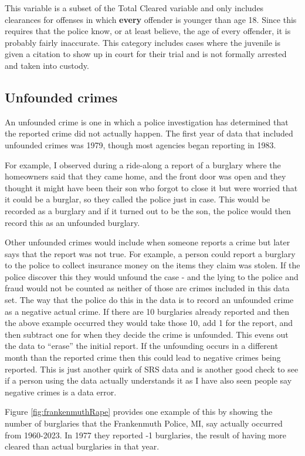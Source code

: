 \documentclass[
]{krantz}
\begin{document}
This variable is a subset of the Total Cleared variable and
only includes clearances for offenses in which
\textbf{every} offender is younger than age 18. Since this
requires that the police know, or at least believe, the age
of every offender, it is probably fairly inaccurate. This
category includes cases where the juvenile is given a
citation to show up in court for their trial and is not
formally arrested and taken into custody.

\subsection{Unfounded crimes}\label{unfounded}

An unfounded crime is one in which a police investigation
has determined that the reported crime did not actually
happen. The first year of data that included unfounded
crimes was 1979, though most agencies began reporting in
1983.

For example, I observed during a ride-along a report of a
burglary where the homeowners said that they came home, and
the front door was open and they thought it might have been
their son who forgot to close it but were worried that it
could be a burglar, so they called the police just in case.
This would be recorded as a burglary and if it turned out to
be the son, the police would then record this as an
unfounded burglary.

Other unfounded crimes would include when someone reports a
crime but later says that the report was not true. For
example, a person could report a burglary to the police to
collect insurance money on the items they claim was stolen.
If the police discover this they would unfound the case -
and the lying to the police and fraud would not be counted
as neither of those are crimes included in this data set. The
way that the police do this in the data is to record an
unfounded crime as a negative actual crime. If there are 10
burglaries already reported and then the above example
occurred they would take those 10, add 1 for the report, and
then subtract one for when they decide the crime is
unfounded. This evens out the data to ``erase'' the initial
report. If the unfounding occurs in a different month than
the reported crime then this could lead to negative crimes
being reported. This is just another quirk of SRS data and
is another good check to see if a person using the data
actually understands it as I have also seen people say
negative crimes is a data error.

Figure \ref{fig:frankenmuthRape} provides one example of
this by showing the number of burglaries that the
Frankenmuth Police, MI, say actually occurred from
1960-2023. In 1977 they reported -1 burglaries, the result
of having more cleared than actual burglaries in that year.
\end{document}
